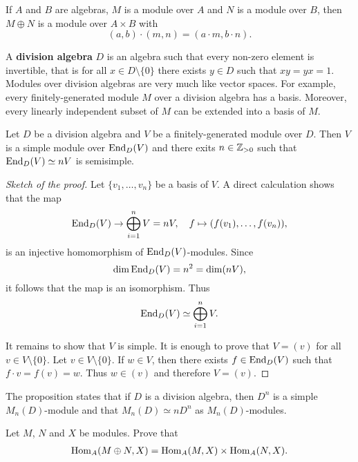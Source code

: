 \begin{exercise}
If $A$ and $B$ are algebras, $M$ is a module over $A$ and $N$ is a module over $B$, then 
    $M\oplus N$ is a module over $A\times B$ with 
    \[
    (a,b)\cdot (m,n)=(a\cdot m,b\cdot n).
    \]
\end{exercise}


A \textbf{division algebra} $D$ is an algebra such that every non-zero element 
is invertible, that is for all $x\in D\setminus\{0\}$ there exists $y\in D$ such that $xy=yx=1$.  
Modules over division algebras are very much like vector spaces.  For example, 
every finitely-generated module $M$ over a division algebra has a basis. 
Moreover, every linearly independent subset of
$M$ can be extended into a basis of $M$. 

\begin{proposition}
	Let $D$ be a division algebra and $V$ be a finitely-generated module over $D$. Then 
	$V$ is a simple module over $\operatorname{End}_D(V)$ and there exits $n\in\mathbb{Z}_{>0}$ such that  
	$\operatorname{End}_D(V)\simeq nV$ is semisimple.
\end{proposition}

\begin{proof}[Sketch of the proof]
	Let $\{v_1,\dots,v_n\}$ be a basis of $V$. A direct calculation shows that the map 
	\[
		\operatorname{End}_D(V)\to\bigoplus_{i=1}^nV=nV,\quad
		f\mapsto (f(v_1),\dots,f(v_n)),
	\]
	is an injective homomorphism of $\operatorname{End}_D(V)$-modules.
	Since
	\[
	\dim\operatorname{End}_D(V)=n^2=\dim(nV),
	\]
	it follows that the map is an isomorphism. 
	Thus 
	\[
		\operatorname{End}_D(V)\simeq \bigoplus_{i=1}^nV.
	\]
	
	It remains to show that $V$ is simple. It is enough to prove that $V=(v)$ 
	for all $v\in V\setminus\{0\}$. Let $v\in V\setminus\{0\}$. If $w\in V$, then 
	there exists $f\in\operatorname{End}_D(V)$ such that $f\cdot v=f(v)=w$. 
	Thus $w\in (v)$ and therefore $V=(v)$.  
\end{proof}

The proposition states that if $D$ is a division algebra, then  
$D^{n}$ is a simple $M_n(D)$-module and that $M_n(D)\simeq n D^n$ as $M_n(D)$-modules. 

\begin{exercise}
    Let $M$, $N$ and $X$ be modules. Prove that 
    \begin{align}
        \operatorname{Hom}_A(M\oplus N,X)=\operatorname{Hom}_A(M,X)\times\operatorname{Hom}_A(N,X).
    \end{align}
\end{exercise}

